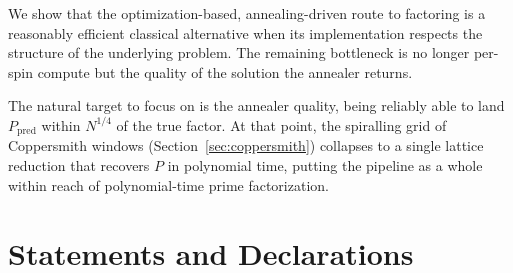 \documentclass[pdflatex,sn-apa]{sn-jnl}%
\theoremstyle{thmstyleone}%
\theoremstyle{thmstyletwo}%
\theoremstyle{thmstylethree}%
\begin{document}
We show that the optimization-based, annealing-driven route to factoring is a reasonably efficient classical alternative when its implementation respects the structure of the underlying problem. The remaining bottleneck is no longer per-spin compute but the quality of the solution the annealer returns.

The natural target to focus on is the annealer quality, being reliably able to land $P_{\mathrm{pred}}$ within $N^{1/4}$ of the true factor. At that point, the spiralling grid of Coppersmith windows (Section~\ref{sec:coppersmith}) collapses to a single lattice reduction that recovers $P$ in polynomial time, putting the pipeline as a whole within reach of polynomial-time prime factorization.

\backmatter

\section*{Statements and Declarations}
\end{document}

